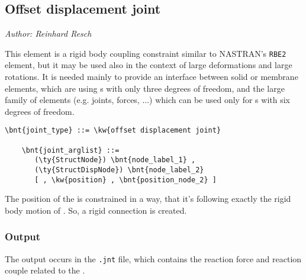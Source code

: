 \subsection{Offset displacement joint}
\label{sec:EL:STRUCT:JOINT:OFFSET_DISP_JOINT}
\emph{Author: Reinhard Resch}

This element is a rigid body coupling constraint similar to NASTRAN's \texttt{RBE2} element,
but it may be used also in the context of large deformations and large rotations.
It is needed mainly to provide an interface between solid or membrane elements, which are using s with only three degrees of freedom,
and the large family of elements (e.g. joints, forces, ...) which can be used only for s with six degrees of freedom.

\begin{Verbatim}[commandchars=\\\{\}]
    \bnt{joint_type} ::= \kw{offset displacement joint}

    \bnt{joint_arglist} ::=
       (\ty{StructNode}) \bnt{node_label_1} ,
       (\ty{StructDispNode}) \bnt{node_label_2}
       [ , \kw{position} , \bnt{position_node_2} ]
\end{Verbatim}

The position of the  is constrained in a way, that it's following exactly the rigid body motion of .
So, a rigid connection is created.

\subsubsection{Output}
The output occurs in the \texttt{.jnt} file, which contains the reaction force and reaction couple related to the .

